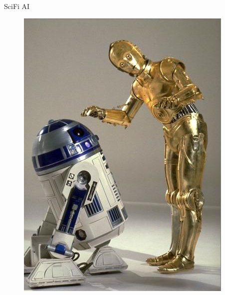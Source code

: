 \documentclass[10pt]{beamer}
\begin{document}
\begin{frame} {SciFi AI}
	\begin{figure}
		\centering
		\begin{minipage}{.33\textwidth}
		  \includegraphics[width=0.8 \linewidth, height=0.8 \textheight, keepaspectratio]{images/c3po_r2d2}
		\end{minipage}%
		\begin{minipage}{.33\textwidth}
				\begin{minipage}{\textwidth}
			\end{minipage}

\end{minipage}
\end{figure}
\end{frame}
\end{document}
